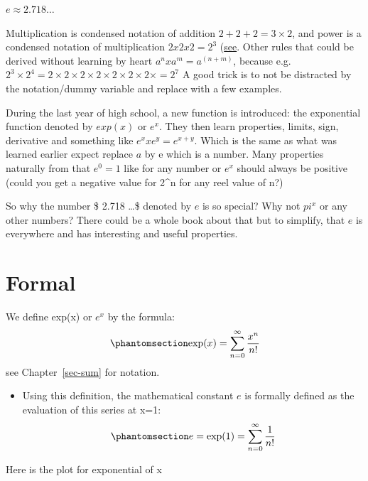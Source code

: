 \documentclass[
  letterpaper,
  DIV=11,
  numbers=noendperiod]{scrreprt}
\providecommand{\tightlist}{%
  \setlength{\itemsep}{0pt}\setlength{\parskip}{0pt}}
\begin{document}
\(e \approx 2.718 \ldots\)

Multiplication is condensed notation of addition
\(2 + 2 + 2 = 3 \times 2\), and power is a condensed notation of
multiplication \(2 x 2 x 2 = 2^3\)
(\href{@sec-matrixOperationMath}{see}. Other rules that could be derived
without learning by heart \(a^n x a^m = a^(n+m)\), because
e.g.~\(2^3 \times 2^4= 2 \times 2 \times 2 \times 2 \times 2 \times 2 \times 2 \times = 2^7\)
A good trick is to not be distracted by the notation/dummy variable and
replace with a few examples.

During the last year of high school, a new function is introduced: the
exponential function denoted by \(exp(x)\) or \(e^x\). They then learn
properties, limits, sign, derivative and something like
\(e^x x e^y = e^{x+y}\). Which is the same as what was learned earlier
expect replace \(a\) by e which is a number. Many properties naturally
from that \(e^0 = 1\) like for any number or \(e^x\) should always be
positive (could you get a negative value for 2\^{}n for any reel value
of n?)

So why the number \$ 2.718 \ldots\$ denoted by \(e\) is so special? Why
not \(pi^x\) or any other numbers? There could be a whole book about
that but to simplify, that \(e\) is everywhere and has interesting and
useful properties.

\section*{Formal}\label{formal-10}


We define exp(x) or \(e^x\) by the formula:
\begin{equation}\protect\phantomsection\label{eq-eTaylor}{
    \exp(x) = \sum_{n=0}^{\infty} \frac{x^n}{n!}
}\end{equation} see Chapter~\ref{sec-sum} for notation.

\begin{itemize}
\tightlist
\item
  Using this definition, the mathematical constant \(e\) is formally
  defined as the evaluation of this series at x=1:
  \begin{equation}\protect\phantomsection\label{eq-e1}{
    e = \exp(1) = \sum_{n=0}^{\infty} \frac{1}{n!}
  }\end{equation}
\end{itemize}

Here is the plot for exponential of x
\end{document}
